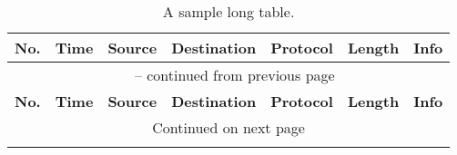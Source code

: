 \documentclass{article}
\begin{document}
\begin{center}
\begin{longtable}{|l|l|l|l|l|l|p{9em}|}
\caption{A sample long table.} \\
\hline 
\multicolumn{1}{|c|}{\textbf{No.}}&
\multicolumn{1}{c|}{\textbf{Time}}&
\multicolumn{1}{c|}{\textbf{Source}}&
\multicolumn{1}{c|}{\textbf{Destination}}&
\multicolumn{1}{c|}{\textbf{Protocol}}&
\multicolumn{1}{c|}{\textbf{Length}}&
\multicolumn{1}{c|}{\textbf{Info}}\\
\hline 
\endfirsthead

\multicolumn{7}{c}{\tablename\ \thetable{} -- continued from previous page}\\
\hline
\multicolumn{1}{|c|}{\textbf{No.}}&
\multicolumn{1}{c|}{\textbf{Time}}&
\multicolumn{1}{c|}{\textbf{Source}}&
\multicolumn{1}{c|}{\textbf{Destination}}&
\multicolumn{1}{c|}{\textbf{Protocol}}&
\multicolumn{1}{c|}{\textbf{Length}}&
\multicolumn{1}{c|}{\textbf{Info}}\\
\hline 
\endhead

\hline
\multicolumn{7}{|c|}{{Continued on next page}}\\
\hline
\endfoot

\hline
\hline
\endlastfoot


\end{longtable}
\end{center}
\end{document}
